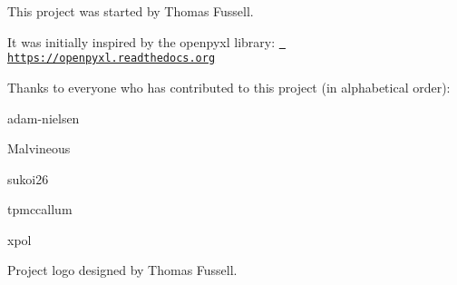 This project was started by Thomas Fussell.

It was initially inspired by the openpyxl library\+: \href{https://openpyxl.readthedocs.org}{\texttt{ https\+://openpyxl.\+readthedocs.\+org}}

Thanks to everyone who has contributed to this project (in alphabetical order)\+:


\begin{DoxyItemize}
\item adam-\/nielsen
\item Malvineous
\item sukoi26
\item tpmccallum
\item xpol
\end{DoxyItemize}

Project logo designed by Thomas Fussell. 